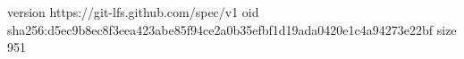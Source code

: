 version https://git-lfs.github.com/spec/v1
oid sha256:d5ec9b8ec8f3eea423abe85f94ce2a0b35efbf1d19ada0420e1c4a94273e22bf
size 951
